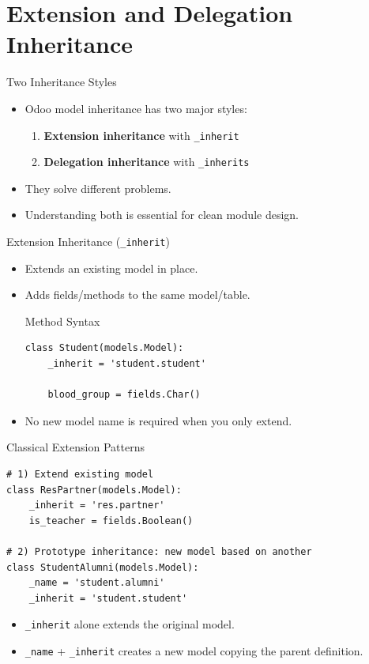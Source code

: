 \section{Extension and Delegation Inheritance}

\begin{frame}{Two Inheritance Styles}
	\begin{itemize}
		\item Odoo model inheritance has two major styles:
		\begin{enumerate}
			\item \textbf{Extension inheritance} with \texttt{\_inherit}
			\item \textbf{Delegation inheritance} with \texttt{\_inherits}
		\end{enumerate}
		\item They solve different problems.
		\item Understanding both is essential for clean module design.
	\end{itemize}
\end{frame}

\begin{frame}[fragile]{Extension Inheritance (\texttt{\_inherit})}
	\begin{itemize}
		\item Extends an existing model in place.
		\item Adds fields/methods to the same model/table.
\begin{block}{Method Syntax}
\begin{lstlisting}
class Student(models.Model):
	_inherit = 'student.student'

	blood_group = fields.Char()
\end{lstlisting}
\end{block}
		\item No new model name is required when you only extend.
	\end{itemize}
\end{frame}

\begin{frame}[fragile]{Classical Extension Patterns}
\begin{lstlisting}
# 1) Extend existing model
class ResPartner(models.Model):
	_inherit = 'res.partner'
	is_teacher = fields.Boolean()

# 2) Prototype inheritance: new model based on another
class StudentAlumni(models.Model):
	_name = 'student.alumni'
	_inherit = 'student.student'
\end{lstlisting}
	\begin{itemize}
		\item \texttt{\_inherit} alone extends the original model.
		\item \texttt{\_name} + \texttt{\_inherit} creates a new model copying the parent definition.
	\end{itemize}
\end{frame}

